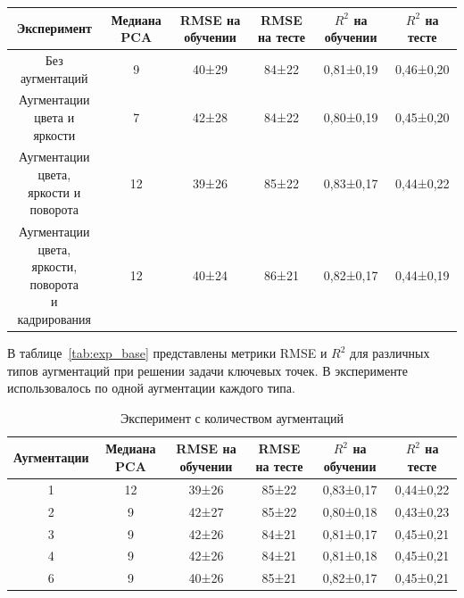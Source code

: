 \documentclass[a4paper,14pt]{article}
\begin{document}
\begin{landscape}
\begin{table}[H]
    	\begin{tabular}{cccccc}
    		\toprule
    		Эксперимент                                    & Медиана PCA  & RMSE на обучении  & RMSE на тесте & $R^2$ на обучении & $R^2$ на тесте  \\
    		\midrule
    		Без аугментаций & 9 & 40±29       & 84±22      & 0,81±0,19 & 0,46±0,20 \\ \hline
    		\makecell{Аугментации \\ цвета и яркости}   & 7 & 42±28       & 84±22      & 0,80±0,19 & 0,45±0,20 \\ \hline
    		\makecell{Аугментации цвета,\\ яркости и поворота}    & 12  & 39±26       & 85±22      & 0,83±0,17 & 0,44±0,22 \\ \hline
    		\makecell{Аугментации цвета,\\ яркости, поворота \\ и кадрирования}    & 12  & 40±24       & 86±21      & 0,82±0,17 & 0,44±0,19 \\
    		\bottomrule
    	\end{tabular}
    	
    \end{table}

	В таблице~\ref{tab:exp_base}  представлены метрики RMSE и $R^2$ для различных типов аугментаций при решении задачи ключевых точек. 
	В эксперименте использовалось по одной аугментации каждого типа.

    \begin{table}[H]
        \centering
        \caption{Эксперимент с количеством аугментаций}
        \label{tab:exp_4}

        \begin{tabular}{cccccc}
            \toprule
            Аугментации & Медиана PCA &  RMSE на обучении  & RMSE на тесте & $R^2$ на обучении & $R^2$ на тесте  \\
            \midrule
            1        & 12           &  39±26       & 85±22      & 0,83±0,17 & 0,44±0,22 \\
            2        & 9            &  42±27       & 85±22      & 0,80±0,18 & 0,43±0,23 \\
            3        & 9            &  42±26       & 84±21      & 0,81±0,17 & 0,45±0,21 \\
            4        & 9            &  42±26       & 84±21      & 0,81±0,18 & 0,45±0,21 \\
            6        & 9            &  40±26       & 85±21      & 0,82±0,17 & 0,45±0,21 \\
            \bottomrule
        \end{tabular}


\end{table}
\end{landscape}
\end{document}
